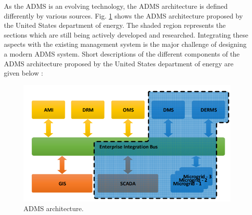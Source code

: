 As the ADMS is an evolving technology, the ADMS architecture is defined differently by various sources. Fig. \ref{fig:ADMS_ARCH} shows the ADMS architecture proposed by the United States department of energy. The shaded region represents the sections which are still being actively developed and researched. Integrating these aspects with the existing management system is the major challenge of designing a modern ADMS system. Short descriptions of the different components of the ADMS architecture proposed by the United States department of energy are given below \cite{ADMS_2}:

\begin{figure}[!h]
\centering
\includegraphics[width=0.85\linewidth]{figs/ADMS_ARCH.png}
\caption[ADMS architecture]{ADMS architecture. \cite{ADMS_2}}
\label{fig:ADMS_ARCH}
\end{figure}

